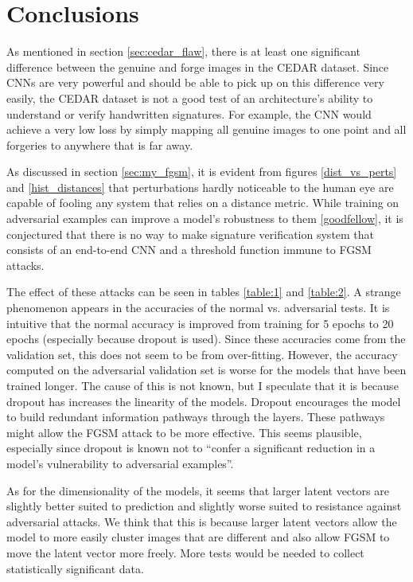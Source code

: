 \section{Conclusions}\label{sec:conclusion}

As mentioned in section \ref{sec:cedar_flaw}, there is at least one significant difference between the genuine and forge images in the CEDAR dataset.
Since CNNs are very powerful and should be able to pick up on this difference very easily, the CEDAR dataset is not a good test of an architecture's ability to understand or verify handwritten signatures.
For example, the CNN would achieve a very low loss by simply mapping all genuine images to one point and all forgeries to anywhere that is far away.

As discussed in section \ref{sec:my_fgsm}, it is evident from figures \ref{dist_vs_perts} and \ref{hist_distances} that perturbations hardly noticeable to the human eye are capable of fooling any system that relies on a distance metric.
While training on adversarial examples can improve a model's robustness to them \ref{goodfellow}, it is conjectured that there is no way to make signature verification system that consists of an end-to-end CNN and a threshold function immune to FGSM attacks.

The effect of these attacks can be seen in tables \ref{table:1} and \ref{table:2}.
A strange phenomenon appears in the accuracies of the normal vs. adversarial tests.
It is intuitive that the normal accuracy is improved from training for 5 epochs to 20 epochs (especially because dropout is used).
Since these accuracies come from the validation set, this does not seem to be from over-fitting.
However, the accuracy computed on the adversarial validation set is worse for the models that have been trained longer.
The cause of this is not known, but I speculate that it is because dropout has increases the linearity of the models.
Dropout encourages the model to build redundant information pathways through the layers.
These pathways might allow the FGSM attack to be more effective.
This seems plausible, especially since dropout is known not to ``confer a significant reduction in a model's vulnerability to adversarial examples''\cite{goodfellow}.

As for the dimensionality of the models, it seems that larger latent vectors are slightly better suited to prediction and slightly worse suited to resistance against adversarial attacks.
We think that this is because larger latent vectors allow the model to more easily cluster images that are different and also allow FGSM to move the latent vector more freely.
More tests would be needed to collect statistically significant data.

